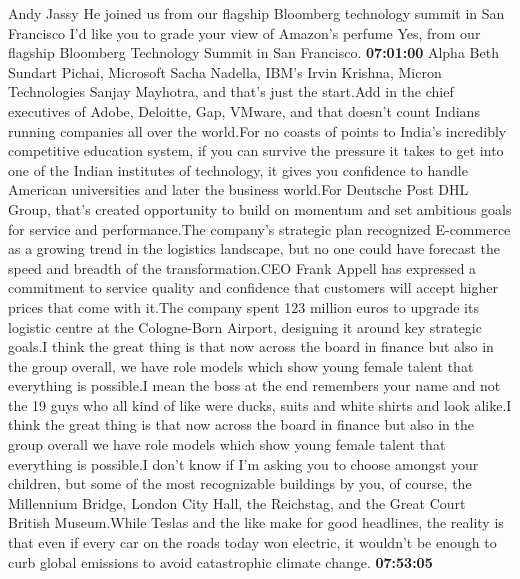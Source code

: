 \documentclass{article}%
\begin{document}
Andy Jassy He joined us from our flagship Bloomberg technology summit in San Francisco I'd like you to grade your view of Amazon's perfume  Yes, from our flagship Bloomberg Technology Summit in San Francisco.%
\textbf{07:01:00}%
\newline%
Alpha Beth Sundart Pichai, Microsoft Sacha Nadella, IBM's Irvin Krishna, Micron Technologies Sanjay Mayhotra, and that's just the start.Add in the chief executives of Adobe, Deloitte, Gap, VMware, and that doesn't count Indians running companies all over the world.For no coasts of points to India's incredibly competitive education system, if you can survive the pressure it takes to get into one of the Indian institutes of technology, it gives you confidence to handle American universities and later the business world.For Deutsche Post DHL Group, that's created opportunity to build on momentum and set ambitious goals for service and performance.The company's strategic plan recognized E{-}commerce as a growing trend in the logistics landscape, but no one could have forecast the speed and breadth of the transformation.CEO Frank Appell has expressed a commitment to service quality and confidence that customers will accept higher prices that come with it.The company spent 123 million euros to upgrade its logistic centre at the Cologne{-}Born Airport, designing it around key strategic goals.I think the great thing is that now across the board in finance but also in the group overall, we have role models which show young female talent that everything is possible.I mean the boss at the end remembers your name and not the 19 guys who all kind of like were ducks, suits and white shirts and look alike.I think the great thing is that now across the board in finance but also in the group overall we have role models which show young female talent that everything is possible.I don't know if I'm asking you to choose amongst your children, but some of the most recognizable buildings by you, of course, the Millennium Bridge, London City Hall, the Reichstag, and the Great Court British Museum.While Teslas and the like make for good headlines, the reality is that even if every car on the roads today won electric, it wouldn't be enough to curb global emissions to avoid catastrophic climate change.%
\textbf{07:53:05}%
\newline%
\end{document}
